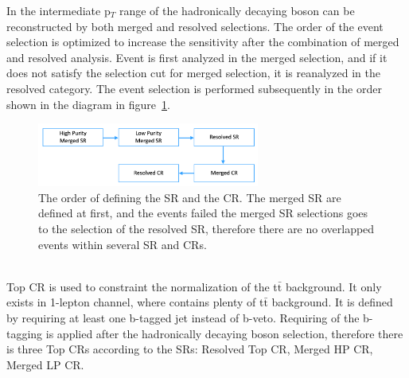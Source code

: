 In the intermediate p$_T$ range of the hadronically decaying boson can be reconstructed by both merged and resolved selections.
The order of the event selection is optimized to increase the sensitivity after the combination of merged and resolved analysis. 
Event is first analyzed in the merged selection, and if it does not satisfy the selection cut for merged selection, it is reanalyzed in the resolved category.
The event selection is performed subsequently in the order shown in the diagram in figure~\ref{fig:order}.
\begin{figure}[H]
    \centering
    \includegraphics[width=0.65\textwidth]{figures/order}
    \caption{The order of defining the SR and the CR. The merged SR are defined at first, and the events failed the merged SR selections goes to the selection of the resolved SR, therefore there are no overlapped events within several SR and CRs.}
    \label{fig:order}
\end{figure}



\noindent\textbf{}  \\
Top CR is used to constraint the normalization of the t$\bar{\mathrm{t}}$ background. It only exists in 1-lepton channel, where contains plenty of t$\bar{\mathrm{t}}$ background. 
It is defined by requiring at least one b-tagged jet instead of b-veto. Requiring of the b-tagging is applied after the hadronically decaying boson selection, therefore there is three Top CRs according to the SRs: Resolved Top CR, Merged HP CR, Merged LP CR.

